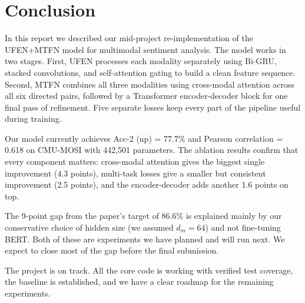 \documentclass[11pt,twocolumn]{article}
\begin{document}
\section{Conclusion}
\label{sec:conclusion}

In this report we described our mid-project re-implementation of the UFEN+MTFN model for multimodal sentiment analysis. The model works in two stages. First, UFEN processes each modality separately using Bi-GRU, stacked convolutions, and self-attention gating to build a clean feature sequence. Second, MTFN combines all three modalities using cross-modal attention across all six directed pairs, followed by a Transformer encoder-decoder block for one final pass of refinement. Five separate losses keep every part of the pipeline useful during training.

Our model currently achieves Acc-2 (np) = 77.7\% and Pearson correlation = 0.618 on CMU-MOSI with 442,501 parameters. The ablation results confirm that every component matters: cross-modal attention gives the biggest single improvement (4.3 points), multi-task losses give a smaller but consistent improvement (2.5 points), and the encoder-decoder adds another 1.6 points on top.

The 9-point gap from the paper's target of 86.6\% is explained mainly by our conservative choice of hidden size (we assumed $d_m = 64$) and not fine-tuning BERT. Both of these are experiments we have planned and will run next. We expect to close most of the gap before the final submission.

The project is on track. All the core code is working with verified test coverage, the baseline is established, and we have a clear roadmap for the remaining experiments.
\end{document}
